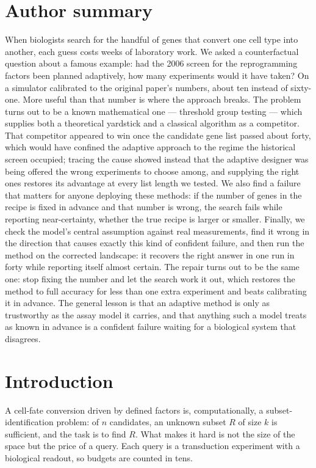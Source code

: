 \documentclass[11pt]{article}
\begin{document}
\section*{Author summary}
\small
When biologists search for the handful of genes that convert one cell type into
another, each guess costs weeks of laboratory work. We asked a counterfactual
question about a famous example: had the 2006 screen for the reprogramming
factors been planned adaptively, how many experiments would it have taken? On a
simulator calibrated to the original paper's numbers, about ten instead of
sixty-one. More useful than that number is where the approach breaks. The
problem turns out to be a known mathematical one --- threshold group testing ---
which supplies both a theoretical yardstick and a classical algorithm as a
competitor. That competitor appeared to win once the candidate gene list passed
about forty, which would have confined the adaptive approach to the regime the
historical screen occupied; tracing the cause showed instead that the adaptive
designer was being offered the wrong experiments to choose among, and supplying
the right ones restores its advantage at every list length we tested. We also
find a failure that matters for anyone deploying these methods: if the number
of genes in the recipe is fixed in advance and that number is wrong, the search
fails while reporting near-certainty, whether the true recipe is larger or
smaller. Finally, we check the model's central assumption against real
measurements, find it wrong in the direction that causes exactly this kind of
confident failure, and then run the method on the corrected landscape: it
recovers the right answer in one run in forty while reporting itself almost
certain. The repair turns out to be the same one: stop fixing the number and
let the search work it out, which restores the method to full accuracy for
less than one extra experiment and beats calibrating it in advance. The
general lesson is that an adaptive method is only as trustworthy as the assay
model it carries, and that anything such a model treats as known in advance is
a confident failure waiting for a biological system that disagrees.
\normalsize

\section{Introduction}

A cell-fate conversion driven by defined factors is, computationally, a
subset-identification problem: of $n$ candidates, an unknown subset $R$ of size
$k$ is sufficient, and the task is to find $R$. What makes it hard is not the
size of the space but the price of a query. Each query is a transduction
experiment with a biological readout, so budgets are counted in tens.
\end{document}
